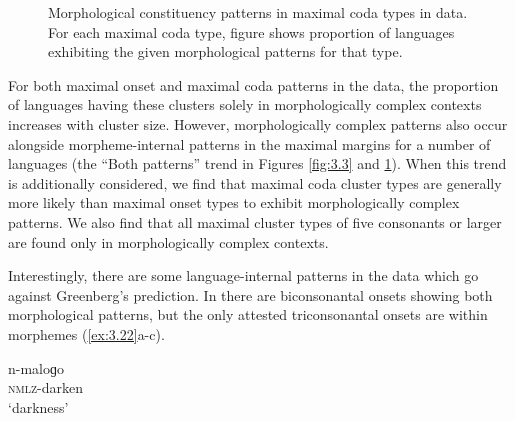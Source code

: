 \begin{figure}
\caption{\label{fig:3.4}Morphological constituency patterns in maximal coda types in data. For each maximal coda type, figure shows proportion of languages exhibiting the given morphological patterns for that type.}
\end{figure}

  For both maximal onset and maximal coda patterns in the data, the proportion of languages having these clusters solely in morphologically complex contexts increases with cluster size. However, morphologically complex patterns also occur alongside morpheme-internal patterns in the maximal margins for a number of languages (the “Both patterns” trend in Figures \ref{fig:3.3} and \ref{fig:3.4}). When this trend is additionally considered, we find that maximal coda cluster types are generally more likely than maximal onset types to exhibit morphologically complex patterns. We also find that all maximal cluster types of five consonants or larger are found only in morphologically complex contexts.

  Interestingly, there are some language-internal patterns in the data which go against Greenberg’s prediction. In  there are biconsonantal onsets showing both morphological patterns, but the only attested triconsonantal onsets are within morphemes (\ref{ex:3.22}a-c).

\ea\label{ex:3.22}

\ea  n-maloɡo\\
\textsc{nmlz}-darken\\
\glt ‘darkness’

